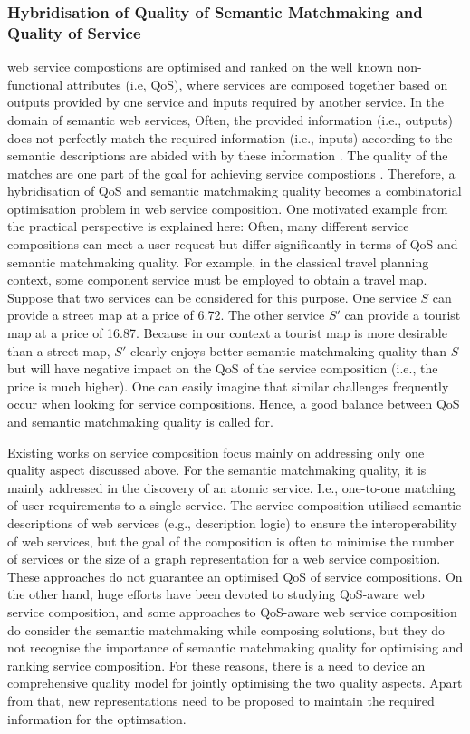 \subsubsection{Hybridisation of Quality of Semantic Matchmaking and Quality of Service}
web service compostions are optimised and ranked on the well known non-functional attributes (i.e, QoS), where services are composed together based on outputs provided by one service and inputs required by another service. In the domain of semantic web services, Often, the provided information (i.e., outputs) does not perfectly match the required information (i.e., inputs) according to the semantic descriptions are abided with by these information \cite{lecue2008optimizing}. The quality of the matches are one part of the goal for achieving service compostions \cite{lecue2009optimizing}. Therefore, a hybridisation of QoS and semantic matchmaking quality becomes a combinatorial optimisation problem in web service composition. One motivated example from the practical perspective is explained here: Often, many different service compositions can meet a user request but differ significantly in terms of QoS and semantic matchmaking quality. For example, in the classical travel planning context, some component service must be employed to obtain a travel map. Suppose that two services can be considered for this purpose. One service $S$ can provide a street map at a price of 6.72. The other service $S'$ can provide a tourist map at a price of 16.87. Because in our context a tourist map is more desirable than a street map, $S'$ clearly enjoys better semantic matchmaking quality than $S$ but will have negative impact on the QoS of the service composition (i.e., the price is much higher). One can easily imagine that similar challenges frequently occur when looking for service compositions. Hence, a good balance between QoS and semantic matchmaking quality is called for.

Existing works on service composition focus mainly on addressing only one quality aspect discussed above. For the semantic matchmaking quality, it is mainly addressed in the discovery of an atomic service. I.e., one-to-one matching of user requirements to a single service. The service composition \cite{bansal2016generalized,boustil2014semantic,mier2015integrated} utilised semantic descriptions of web services (e.g., description logic) to ensure the interoperability of web services, but the goal of the composition is often to minimise the number of services or the size of a graph representation for a web service composition. These approaches do not guarantee an optimised QoS of service compositions. On the other hand, huge efforts have been devoted to studying QoS-aware web service composition, and some approaches to QoS-aware web service composition do consider the semantic matchmaking while composing solutions, but they do not recognise the importance of semantic matchmaking quality for optimising and ranking service composition. For these reasons, there is a need to device an comprehensive quality model for jointly optimising the two quality aspects. Apart from that, new representations need to be proposed to maintain the required information for the optimsation.  


